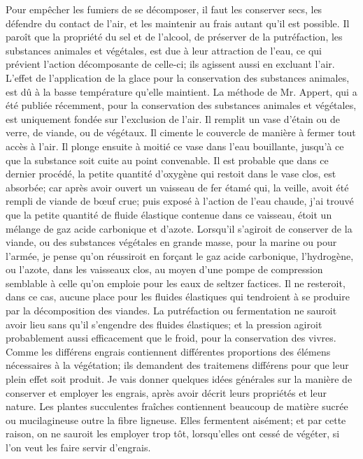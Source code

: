 Pour empêcher les fumiers de se décomposer, il faut les conserver secs, les défendre du contact de l'air, et les maintenir au frais autant qu'il est possible.
Il paroît que la propriété du sel et de l'alcool, de préserver de la putréfaction, les substances animales et végétales, est due à leur attraction de l'eau, ce qui prévient l'action décomposante de celle-ci; ils agissent aussi en excluant l'air. L'effet de l'application de la glace pour la conservation des substances animales, est dû à la basse température qu'elle maintient. La méthode de Mr. Appert, qui a été publiée récemment, pour la conservation des substances animales et végétales, est uniquement fondée sur l'exclusion de l'air. Il remplit un vase d'étain ou de verre, de viande, ou de végétaux. Il cimente le couvercle de manière à fermer\setcounter{page}{157} tout accès à l'air. Il plonge ensuite à moitié ce vase dans l'eau bouillante, jusqu'à ce que la substance soit cuite au point convenable. Il est probable que dans ce dernier procédé, la petite quantité d'oxygène qui restoit dans le vase clos, est absorbée; car après avoir ouvert un vaisseau de fer étamé qui, la veille, avoit été rempli de viande de bœuf crue; puis exposé à l'action de l'eau chaude, j'ai trouvé que la petite quantité de fluide élastique contenue dans ce vaisseau, étoit un mélange de gaz acide carbonique et d'azote. Lorsqu'il s'agiroit de conserver de la viande, ou des substances végétales en grande masse, pour la marine ou pour l'armée, je pense qu'on réussiroit en forçant le gaz acide carbonique, l'hydrogène, ou l'azote, dans les vaisseaux clos, au moyen d'une pompe de compression semblable à celle qu'on emploie pour les eaux de seltzer factices. Il ne resteroit, dans ce cas, aucune place pour les fluides élastiques qui tendroient à se produire par la décomposition des viandes. La putréfaction ou fermentation ne sauroit avoir lieu sans qu'il s'engendre des fluides élastiques; et la pression agiroit probablement aussi efficacement que le froid, pour la conservation des vivres. Comme les différens engrais contiennent\setcounter{page}{158} différentes proportions des élémens nécessaires à la végétation; ils demandent des traitemens différens pour que leur plein effet soit produit. Je vais donner quelques idées générales sur la manière de conserver et employer les engrais, après avoir décrit leurs propriétés et leur nature.
Les plantes succulentes fraîches contiennent beaucoup de matière sucrée ou mucilagineuse outre la fibre ligneuse. Elles fermentent aisément; et par cette raison, on ne sauroit les employer trop tôt, lorsqu'elles ont cessé de végéter, si l'on veut les faire servir d'engrais.
